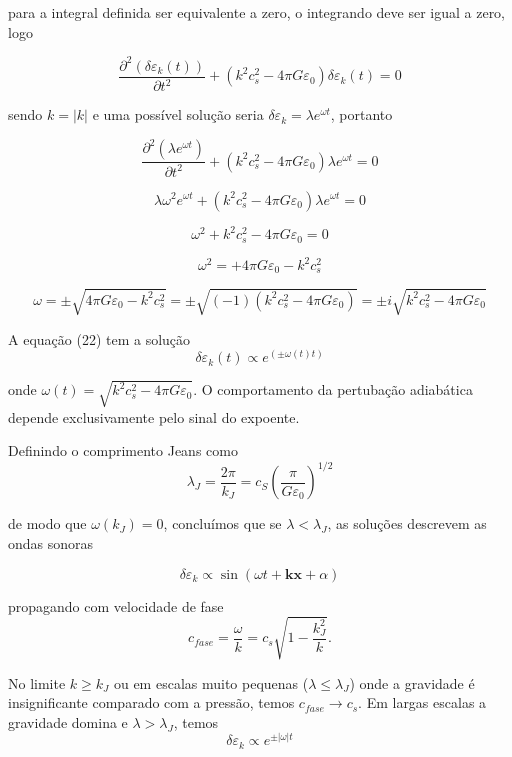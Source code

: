 \documentclass[a4paper,12pt]{article}
\begin{document}
para a integral definida ser equivalente a zero, o integrando deve ser igual a zero, logo

\begin{equation}
	\dfrac{\partial^2 (\delta\varepsilon_k (t))}{\partial t^2} +(k^2c^2_s - 4\pi G\varepsilon_0)\delta\varepsilon_k (t) = 0
\end{equation}

sendo $k = |k|$ e uma possível solução seria $\delta\varepsilon_k=\lambda e^{\omega t}$, portanto

$$\dfrac{\partial^2 (\lambda e^{\omega t})}{\partial t^2} +(k^2c^2_s - 4\pi G\varepsilon_0)\lambda e^{\omega t} = 0$$

$$\lambda\omega^2 e^{\omega t} +(k^2c^2_s - 4\pi G\varepsilon_0)\lambda e^{\omega t} = 0$$

$$\omega^2  + k^2c^2_s - 4\pi G\varepsilon_0 = 0$$

$$\omega^2  =  + 4\pi G\varepsilon_0 -k^2c^2_s $$

$$\omega = \pm \sqrt{4\pi G\varepsilon_0 -k^2c^2_s} =  \pm \sqrt{(-1)(k^2c^2_s - 4\pi G\varepsilon_0) }= \pm i \sqrt{k^2c^2_s - 4\pi G\varepsilon_0} $$

A equação (22) tem a solução
\begin{equation}
	\delta\varepsilon_k (t) \propto e^{(\pm \omega (t) t)}
\end{equation}

onde $\omega (t) = \sqrt{k^2c^2_s - 4\pi G \varepsilon_0}$. O comportamento da pertubação adiabática depende exclusivamente pelo sinal do expoente. 

Definindo o comprimento Jeans como
\begin{equation}
	\lambda_J = \dfrac{2\pi}{k_J} = c_S \left(\dfrac{\pi}{G\varepsilon_0} \right)^{1/2}
\end{equation}

de modo que $\omega (k_J) = 0$, concluímos que se $\lambda < \lambda_J$, as soluções descrevem as ondas sonoras

\begin{equation}
	\delta\varepsilon_k \propto \sin (\omega t + \mathbf{k}\mathbf{x} + \alpha)
\end{equation}

propagando com velocidade de fase
\begin{equation}
 	c_{fase} = \dfrac{\omega}{k}= c_s\sqrt{1 - \dfrac{k^2_J}{k}}.
\end{equation}

No limite $k \geq k_J$ ou em escalas muito pequenas ($\lambda \leq \lambda_J$) onde a gravidade é insignificante comparado com a pressão, temos $c_{fase} \to c_s$.
Em largas escalas a gravidade domina e $\lambda > \lambda_J$, temos
\begin{equation}
	\delta\varepsilon_k \propto e^{\pm |\omega| t }
\end{equation}
\end{document}
